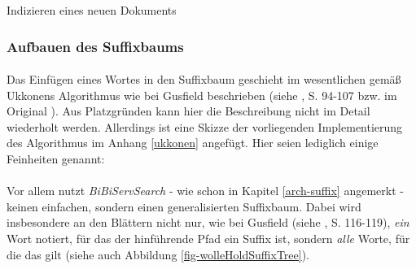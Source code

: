 \begin{algorithm}
\caption{Indizieren eines neuen Dokuments}
\label{code-insert}
\begin{algorithmic}
	\ELSE
	\ENDIF
	\ELSE
	\ENDIF
	\ENDIF
\ENDFOR
\end{algorithmic}
\end{algorithm}

\subsubsection{Aufbauen des Suffixbaums}
\label{algo-suffix}

\paragraph{} Das Einfügen eines Wortes in den Suffixbaum geschieht im wesentlichen gemäß Ukkonens Algorithmus wie bei Gusfield beschrieben (siehe \cite{gusfield}, S. 94-107 bzw. im Original \cite{ukkonen}). Aus Platzgründen kann hier die Beschreibung nicht im Detail wiederholt werden. Allerdings ist eine Skizze der vorliegenden Implementierung des Algorithmus im Anhang \ref{ukkonen} angefügt. Hier seien lediglich einige Feinheiten genannt:
\paragraph{} Vor allem nutzt \textit{BiBiServSearch} - wie schon in Kapitel \ref{arch-suffix} angemerkt - keinen einfachen, sondern einen generalisierten Suffixbaum. Dabei wird insbesondere an den Blättern nicht nur, wie bei Gusfield (siehe \cite{gusfield}, S. 116-119), \textit{ein} Wort notiert, für das der hinführende Pfad ein Suffix ist, sondern \textit{alle} Worte, für die das gilt (siehe auch Abbildung \ref{fig-wolleHoldSuffixTree}).
